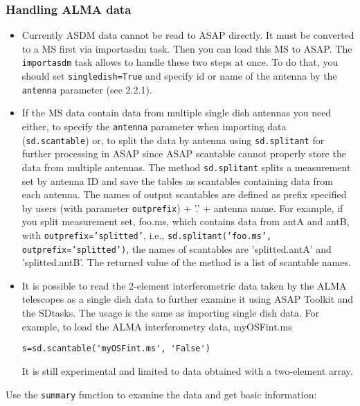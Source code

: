 \subsubsection{Handling ALMA data}

\begin{itemize}
\item Currently ASDM data cannot be read to ASAP directly. It must be converted
to a MS first via importasdm task. Then you can load this MS to ASAP. The
 {\tt importasdm} task allows to handle these two steps at once. To do
 that, you should set {\tt singledish=True} and specify id or name of the
 antenna by the {\tt antenna} parameter (see 2.2.1). %

\item If the MS data contain data from multiple single dish antennas you need either, to 
specify the {\tt antenna} parameter when importing data ({\tt sd.scantable}) or,
 to split the data by antenna using {\tt sd.splitant} for further processing in ASAP 
since ASAP scantable cannot properly store the data from multiple antennas.
The method {\tt sd.splitant} splits a measurement set by antenna ID
and save the tables as scantables containing data from each antenna. 
The names of output scantables are defined as prefix specified by
users (with parameter {\tt outprefix}) + '.' + antenna name. For
example, if you split measurement set, foo.ms, which contains data
from antA and antB, with {\tt outprefix='splitted'}, i.e., 
{\tt sd.splitant('foo.ms', outprefix='splitted')}, the names of scantables
are 'splitted.antA' and 'splitted.antB'.  
The returned value of the method is a list of scantable names. 

\item It is possible to read the 2-element interferometric
data taken by the ALMA telescopes 
as a single dish data to further examine it using ASAP Toolkit and
the SDtasks. The usage is the same as importing single
dish data. 
For example, to load the ALMA interferometry data, myOSFint.ms
\begin{verbatim} 
s=sd.scantable('myOSFint.ms', 'False')
\end{verbatim} 
It is still experimental and limited to data obtained with a
two-element array.
\end{itemize}

Use the {\tt summary} function to examine the data and get basic information:

